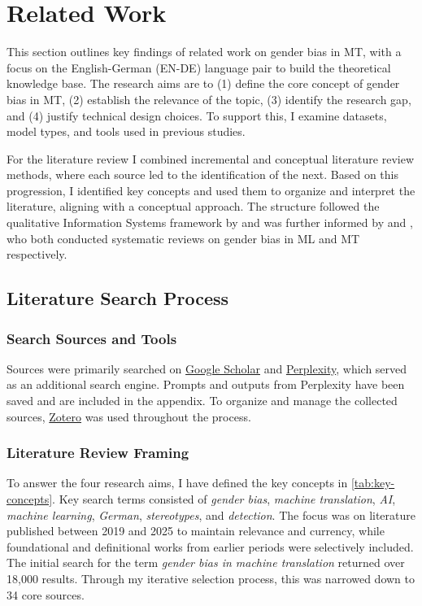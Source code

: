 \chapter{Related Work}

This section outlines key findings of related work on gender bias in MT, with a focus on the English-German (EN-DE) language pair to build the theoretical knowledge base. The research aims are to (1) define the core concept of gender bias in MT, (2) establish the relevance of the topic, (3) identify the research gap, and (4) justify technical design choices. To support this, I examine datasets, model types, and tools used in previous studies.

For the literature review I combined incremental and conceptual literature review methods, where each source led to the identification of the next. Based on this progression, I identified key concepts and used them to organize and interpret the literature, aligning with a conceptual approach. The structure followed the qualitative Information Systems framework by \citet{schryenWritingQualitativeLiterature2015} and was further informed by \citet{shresthaExploringGenderBiases2022} and \citet{savoldiDecadeGenderBias2025}, who both conducted systematic reviews on gender bias in ML and MT respectively. 

\section{Literature Search Process}

\subsection{Search Sources and Tools}
Sources were primarily searched on \href{https://scholar.google.com/}{Google Scholar} and \href{https://www.perplexity.ai/}{Perplexity}, which served as an additional search engine. Prompts and outputs from Perplexity have been saved and are included in the appendix. To organize and manage the collected sources, \href{https://www.zotero.org/}{Zotero} was used throughout the process.

\subsection{Literature Review Framing}

To answer the four research aims, I have defined the key concepts in \autoref{tab:key-concepts}. Key search terms consisted of \textit{gender bias}, \textit{machine translation}, \textit{AI}, \textit{machine learning}, \textit{German}, \textit{stereotypes}, and \textit{detection}. The focus was on literature published between 2019 and 2025 to maintain relevance and currency, while foundational and definitional works from earlier periods were selectively included. The initial search for the term \textit{gender bias in machine translation} returned over 18,000 results. Through my iterative selection process, this was narrowed down to 34 core sources.


